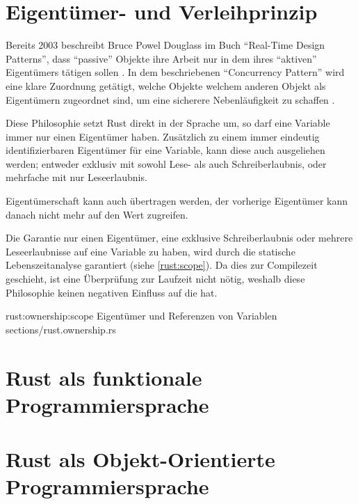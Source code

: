 

\section{Eigentümer- und Verleihprinzip}
\label{rust:ownership}

Bereits 2003 beschreibt Bruce Powel Douglass im Buch \enquote{Real-Time Design Patterns}, dass \enquote{passive} Objekte ihre Arbeit nur in dem  ihres \enquote{aktiven} Eigentümers tätigen sollen \cite[204]{douglass2003real}.
In dem beschriebenen \enquote{Concurrency Pattern} wird eine klare Zuordnung getätigt, welche Objekte welchem anderen Objekt als Eigentümern zugeordnet sind, um eine sicherere Nebenläufigkeit zu schaffen .

Diese Philosophie setzt Rust direkt in der Sprache um, so darf eine Variable immer nur einen Eigentümer haben. Zusätzlich zu einem immer eindeutig identifizierbaren Eigentümer für eine Variable, kann diese auch ausgeliehen werden; entweder exklusiv mit sowohl Lese- als auch Schreiberlaubnis, oder mehrfache mit nur Leseerlaubnis.

Eigentümerschaft kann auch übertragen werden, der vorherige Eigentümer kann danach nicht mehr auf den Wert zugreifen.

Die Garantie nur einen Eigentümer, eine exklusive Schreiberlaubnis oder mehrere Leseerlaubnisse auf eine Variable zu haben, wird durch die statische Lebenszeitanalyse garantiert (siehe \autoref{rust:scope}).
Da dies zur Compilezeit geschieht, ist eine Überprüfung zur Laufzeit nicht nötig, weshalb diese Philosophie keinen negativen Einfluss auf die  hat.

\rustcinclude
	{rust:ownership:scope}
	{Eigentümer und Referenzen von Variablen}
	{sections/rust.ownership.rs}




\section{Rust als funktionale Programmiersprache}

\section{Rust als Objekt-Orientierte Programmiersprache}


